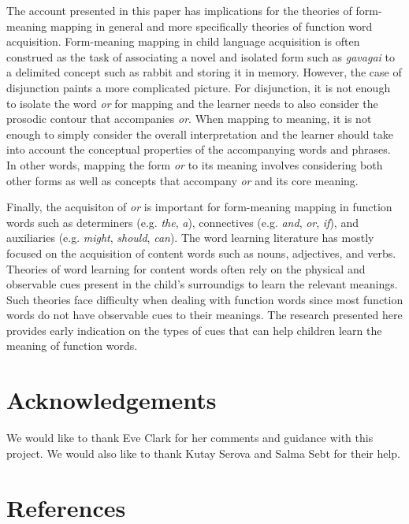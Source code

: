 \documentclass[10pt, letterpaper]{article}
\begin{document}
The account presented in this paper has implications for the theories of
form-meaning mapping in general and more specifically theories of
function word acquisition. Form-meaning mapping in child language
acquisition is often construed as the task of associating a novel and
isolated form such as \emph{gavagai} to a delimited concept such as
rabbit and storing it in memory. However, the case of disjunction paints
a more complicated picture. For disjunction, it is not enough to isolate
the word \emph{or} for mapping and the learner needs to also consider
the prosodic contour that accompanies \emph{or}. When mapping to
meaning, it is not enough to simply consider the overall interpretation
and the learner should take into account the conceptual properties of
the accompanying words and phrases. In other words, mapping the form
\emph{or} to its meaning involves considering both other forms as well
as concepts that accompany \emph{or} and its core meaning.

Finally, the acquisiton of \emph{or} is important for form-meaning
mapping in function words such as determiners (e.g. \emph{the},
\emph{a}), connectives (e.g. \emph{and}, \emph{or}, \emph{if}), and
auxiliaries (e.g. \emph{might}, \emph{should}, \emph{can}). The word
learning literature has mostly focused on the acquisition of content
words such as nouns, adjectives, and verbs. Theories of word learning
for content words often rely on the physical and observable cues present
in the child's surroundigs to learn the relevant meanings. Such theories
face difficulty when dealing with function words since most function
words do not have observable cues to their meanings. The research
presented here provides early indication on the types of cues that can
help children learn the meaning of function words.

\section{Acknowledgements}\label{acknowledgements}

We would like to thank Eve Clark for her comments and guidance with this
project. We would also like to thank Kutay Serova and Salma Sebt for
their help.

\section{References}\label{references}

\setlength{\parindent}{-0.1in} \setlength{\leftskip}{0.125in} \noindent
\end{document}
